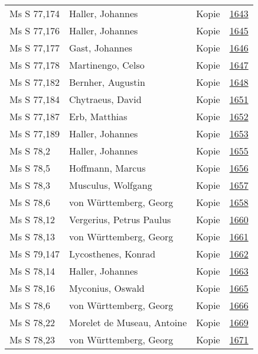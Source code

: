\documentclass[10pt,a4paper,landscape]{report}
\begin{document}
\begin{longtable}{p{16cm}p{4cm}lr}
Ms S 77,174	&	Haller, Johannes	&	Kopie	&	\href{http://130.60.24.72/assignment/1643}{1643}\\
Ms S 77,176	&	Haller, Johannes	&	Kopie	&	\href{http://130.60.24.72/assignment/1645}{1645}\\
Ms S 77,177	&	Gast, Johannes	&	Kopie	&	\href{http://130.60.24.72/assignment/1646}{1646}\\
Ms S 77,178	&	Martinengo, Celso	&	Kopie	&	\href{http://130.60.24.72/assignment/1647}{1647}\\
Ms S 77,182	&	Bernher, Augustin	&	Kopie	&	\href{http://130.60.24.72/assignment/1648}{1648}\\
Ms S 77,184	&	Chytraeus, David	&	Kopie	&	\href{http://130.60.24.72/assignment/1651}{1651}\\
Ms S 77,187	&	Erb, Matthias	&	Kopie	&	\href{http://130.60.24.72/assignment/1652}{1652}\\
Ms S 77,189	&	Haller, Johannes	&	Kopie	&	\href{http://130.60.24.72/assignment/1653}{1653}\\
Ms S 78,2	&	Haller, Johannes	&	Kopie	&	\href{http://130.60.24.72/assignment/1655}{1655}\\
Ms S 78,5	&	Hoffmann, Marcus	&	Kopie	&	\href{http://130.60.24.72/assignment/1656}{1656}\\
Ms S 78,3	&	Musculus, Wolfgang	&	Kopie	&	\href{http://130.60.24.72/assignment/1657}{1657}\\
Ms S 78,6	&	von Württemberg, Georg	&	Kopie	&	\href{http://130.60.24.72/assignment/1658}{1658}\\
Ms S 78,12	&	Vergerius, Petrus Paulus	&	Kopie	&	\href{http://130.60.24.72/assignment/1660}{1660}\\
Ms S 78,13	&	von Württemberg, Georg	&	Kopie	&	\href{http://130.60.24.72/assignment/1661}{1661}\\
Ms S 79,147	&	Lycosthenes, Konrad	&	Kopie	&	\href{http://130.60.24.72/assignment/1662}{1662}\\
Ms S 78,14	&	Haller, Johannes	&	Kopie	&	\href{http://130.60.24.72/assignment/1663}{1663}\\
Ms S 78,16	&	Myconius, Oswald	&	Kopie	&	\href{http://130.60.24.72/assignment/1665}{1665}\\
Ms S 78,6	&	von Württemberg, Georg	&	Kopie	&	\href{http://130.60.24.72/assignment/1666}{1666}\\
Ms S 78,22	&	Morelet de Museau, Antoine	&	Kopie	&	\href{http://130.60.24.72/assignment/1669}{1669}\\
Ms S 78,23	&	von Württemberg, Georg	&	Kopie	&	\href{http://130.60.24.72/assignment/1671}{1671}\\

\end{longtable}
\end{document}
